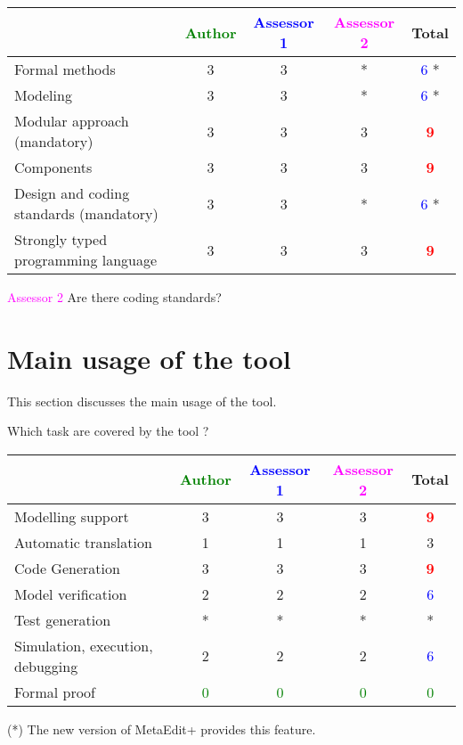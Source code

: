 \begin{tabular}{|l | c | c | c | c|}
\hline
& \textcolor{green}{Author} & \textcolor{blue}{Assessor 1} & \textcolor{magenta}{Assessor 2} & Total \\
\hline
Formal methods  &3 &3 & * & \textcolor{blue}{6} * \\
\hline 
Modeling  &3 &3 & * & \textcolor{blue}{6} * \\
\hline
Modular approach (mandatory) &3 &3 & 3    & \textcolor{red}{\textbf{9}} \\
\hline
Components &3 &3 & 3    & \textcolor{red}{\textbf{9}} \\
\hline
Design and coding standards (mandatory) &3 &3 & *& \textcolor{blue}{6} * \\
\hline
Strongly typed programming language &3 &3 & 3    & \textcolor{red}{\textbf{9}} \\
\hline

\end{tabular}

\textcolor{magenta}{Assessor 2} Are there coding standards?

\section{Main usage of the tool}
\label{main_usage}

This section discusses the main usage of the tool.

Which task are covered by the tool ?


\begin{tabular}{|l | c | c | c | c|}
\hline
& \textcolor{green}{Author} & \textcolor{blue}{Assessor 1} & \textcolor{magenta}{Assessor 2} & Total \\
\hline 
Modelling support &3 &3 & 3    & \textcolor{red}{\textbf{9}} \\
\hline
Automatic translation  &1 &1 & 1    & 3     \\
\hline
Code Generation  &3 &3 & 3    & \textcolor{red}{\textbf{9}} \\
\hline
Model verification &2 &2 & 2    & \textcolor{blue}{6} \\
\hline
Test generation &* &* & *& * \\
\hline
Simulation, execution, debugging &2 &2 & 2    & \textcolor{blue}{6} \\
\hline
Formal proof & \textcolor{green}{0}   & \textcolor{green}{0}   & \textcolor{green}{0} & \textcolor{green}{0} \\
\hline
\end{tabular}
\begin{author_comment}
(*) The new version of MetaEdit+ provides this feature.
\end{author_comment}

